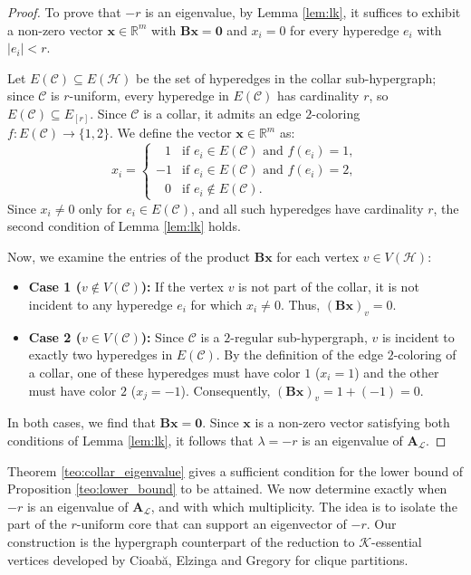 \documentclass[12pt,reqno]{amsart}
\begin{document}
\begin{proof}
To prove that $-r$ is an eigenvalue, by Lemma \ref{lem:lk}, it suffices to exhibit a non-zero vector $\mathbf{x} \in \mathbb{R}^{m}$ with $\mathbf{B}\mathbf{x} = \mathbf{0}$ and $x_i = 0$ for every hyperedge $e_i$ with $|e_i| < r$.

Let $E(\mathcal{C}) \subseteq E(\mathcal{H})$ be the set of hyperedges in the collar sub-hypergraph; since $\mathcal{C}$ is $r$-uniform, every hyperedge in $E(\mathcal{C})$ has cardinality $r$, so $E(\mathcal{C}) \subseteq E_{[r]}$. Since $\mathcal{C}$ is a collar, it admits an edge $2$-coloring $f: E(\mathcal{C}) \to \{1, 2\}$. We define the vector $\mathbf{x} \in \mathbb{R}^m$ as:
$$x_i = \begin{cases} 
\;\;\,1 & \text{if } e_i \in E(\mathcal{C}) \text{ and } f(e_i) = 1, \\ 
-1 & \text{if } e_i \in E(\mathcal{C}) \text{ and } f(e_i) = 2, \\
\;\;\,0 & \text{if } e_i \notin E(\mathcal{C}).
\end{cases}$$
Since $x_i \neq 0$ only for $e_i \in E(\mathcal{C})$, and all such hyperedges have cardinality $r$, the second condition of Lemma \ref{lem:lk} holds.

Now, we examine the entries of the product $\mathbf{B}\mathbf{x}$ for each vertex $v \in V(\mathcal{H})$:
\begin{itemize}
\item \textbf{Case 1 ($v \notin V(\mathcal{C})$):} If the vertex $v$ is not part of the collar, it is not incident to any hyperedge $e_i$ for which $x_i \neq 0$. Thus, $(\mathbf{B}\mathbf{x})_v = 0$.
\item \textbf{Case 2 ($v \in V(\mathcal{C})$):} Since $\mathcal{C}$ is a $2$-regular sub-hypergraph, $v$ is incident to exactly two hyperedges in $E(\mathcal{C})$. By the definition of the edge $2$-coloring of a collar, one of these hyperedges must have color $1$ ($x_i = 1$) and the other must have color $2$ ($x_j = -1$). Consequently, $(\mathbf{B}\mathbf{x})_v = 1 + (-1) = 0.$
\end{itemize}
In both cases, we find that $\mathbf{B}\mathbf{x} = \mathbf{0}$. Since $\mathbf{x}$ is a non-zero vector satisfying both conditions of Lemma \ref{lem:lk}, it follows that $\lambda = -r$ is an eigenvalue of $\mathbf{A}_{\mathcal{L}}$.
\end{proof}

Theorem \ref{teo:collar_eigenvalue} gives a sufficient condition for the lower bound of Proposition \ref{teo:lower_bound} to be attained. We now determine exactly when $-r$ is an eigenvalue of $\mathbf{A}_{\mathcal{L}}$, and with which multiplicity. The idea is to isolate the part of the $r$-uniform core that can support an eigenvector of $-r$. Our construction is the hypergraph counterpart of the reduction to $\mathcal{K}$-essential vertices developed by Cioabă, Elzinga and Gregory \cite{smallest-eigenvalue} for clique partitions.
\end{document}
